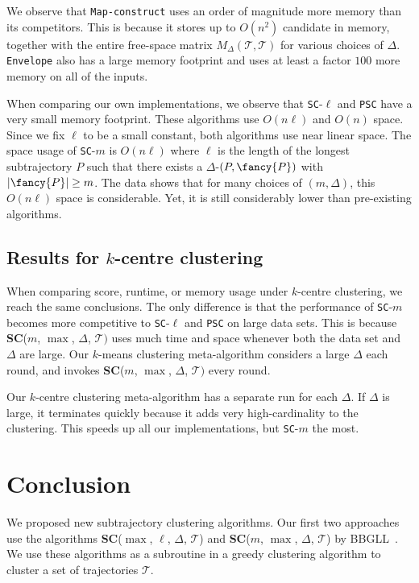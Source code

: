 \documentclass[english, thm-restate]{lipics-v2021}
\begin{document}
We observe that \texttt{Map-construct} uses an order of magnitude more memory than its competitors. This is because it stores up to $O(n^2)$ candidate \pathlets
in memory, together with the entire free-space matrix $M_\Delta(\mathcal{T}, \mathcal{T})$ for various choices of $\Delta$. \texttt{Envelope} also has a large memory footprint and uses at least a factor $100$ more memory on all of the inputs. 

When comparing our own implementations, we observe that \texttt{SC}-$\ell$ and \texttt{PSC} have a very small memory footprint.
These algorithms use $O(n \ell)$ and $O(n)$ space. Since we fix $\ell$ to be a small constant, both algorithms use near linear space.  
The space usage of \texttt{SC}-$m$ is $O(n \ell)$ where $\ell$ is the length of the longest subtrajectory $P$ such that there exists a $\Delta$-\pathlet $(P, {\fancy{P}})$ with $|{\fancy{P}}| \geq m$. 
The data shows that for many choices of $(m, \Delta)$, this $O(n \ell)$ space is considerable. Yet, it is still considerably lower than pre-existing algorithms.

\subsection{Results for $k$-centre clustering}
When comparing score, runtime, or memory usage under $k$-centre clustering, we reach the same conclusions. 
The only difference is that  the performance of \texttt{SC}-$m$ becomes more competitive to \texttt{SC}-$\ell$ and \texttt{PSC} on large data sets. 
This is because \textbf{SC}($m$,  $\max$, $\Delta$, $\mathcal{T})$ uses much time and space whenever both the data set and $\Delta$ are large. 
Our $k$-means clustering meta-algorithm considers a large $\Delta$ each round, and invokes \textbf{SC}($m$,  $\max$, $\Delta$, $\mathcal{T})$ every round.


Our $k$-centre clustering meta-algorithm has a separate run for each $\Delta$. If $\Delta$ is large, it terminates quickly because it adds very high-cardinality \pathlets to the clustering. 
This speeds up all our implementations, but \texttt{SC}-$m$ the most. 



\section{Conclusion}

We proposed new subtrajectory clustering algorithms.
Our first two approaches use the algorithms \textbf{SC}($\max$, $\ell$, $\Delta$, $\mathcal{T}$) and \textbf{SC}($m$, $\max$, $\Delta$, $\mathcal{T}$) by BBGLL~\cite{buchin2011detecting}. 
We use these algorithms as a subroutine in a greedy clustering algorithm to cluster a set of trajectories $\mathcal{T}$.
\end{document}
